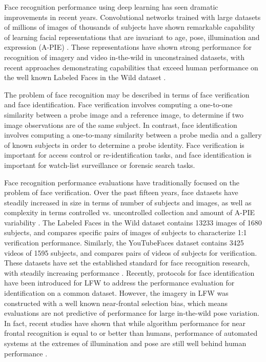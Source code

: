 \documentclass[10pt,twocolumn,letterpaper]{article}
\theoremstyle{definition}		\newtheorem{defn}[thm]{Definition}
\begin{document}
Face recognition performance using deep learning has seen dramatic improvements in recent years.  Convolutional networks trained with large datasets of millions of images of thousands of subjects have shown remarkable capability of learning facial representations that are invariant to age, pose, illumination and expression (A-PIE) \cite{Parkhi15,Taigman14,Schroff15,Taigman15,Sun14,Sun15}.  These representations have shown strong performance for recognition of imagery and video in-the-wild in unconstrained datasets, with recent approaches demonstrating capabilities that exceed human performance on the well known Labeled Faces in the Wild dataset \cite{Huang07}.  

The problem of face recognition may be described in terms of face verification and face identification.  Face verification involves computing a one-to-one similarity between a probe image and a reference image, to determine if two image observations are of the same subject.  In contrast, face identification involves computing a one-to-many similarity between a probe media and a gallery of known subjects in order to determine a probe identity. Face verification is important for access control or re-identification tasks, and face identification is important for watch-list surveillance or forensic search tasks.  

Face recognition performance evaluations have traditionally focused on the problem of face verification.  Over the past fifteen years, face datasets have steadily increased in size in terms of number of subjects and images, as well as complexity in terms controlled vs. uncontrolled collection and amount of A-PIE variability \cite{Miller15}.   The Labeled Faces in the Wild dataset \cite{Huang07} contains 13233 images of 1680 subjects, and compares specific pairs of images of subjects to characterize 1:1 verification performance.  Similarly, the YouTubeFaces dataset \cite{Wolf11} contains 3425 videos of 1595 subjects, and compares pairs of videos of subjects for verification.  These datasets have set the established standard for face recognition research, with steadily increasing performance \cite{Lu15,Taigman14,Schroff15,Parkhi15}.  Recently, protocols for face identification have been introduced for LFW \cite{Rowden14} to address the performance evaluation for identification on a common dataset.  However, the imagery in LFW was constructed with a well known near-frontal selection bias, which means evaluations are not predictive of performance for large in-the-wild pose variation.  In fact, recent studies have shown that while algorithm performance for near frontal recognition is equal to or better than humans, performance of automated systems at the extremes of illumination and pose are still well behind human performance \cite{Phillips15}.  
\end{document}
